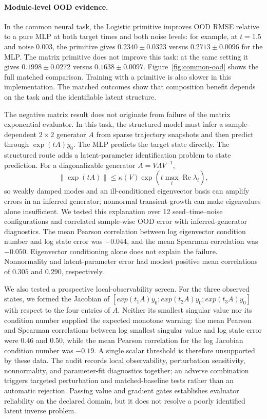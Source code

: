 \documentclass[preprint,12pt]{elsarticle}
\begin{document}
\paragraph{Module-level OOD evidence.}
In the common neural task, the Logistic primitive improves OOD RMSE relative to a pure MLP at both target times and both noise levels: for example, at $t=1.5$ and noise $0.003$, the primitive gives $0.2340\pm0.0323$ versus $0.2713\pm0.0096$ for the MLP. The matrix primitive does not improve this task: at the same setting it gives $0.1998\pm0.0272$ versus $0.1638\pm0.0097$. Figure~\ref{fig:common-ood} shows the full matched comparison. Training with a primitive is also slower in this implementation. The matched outcomes show that composition benefit depends on the task and the identifiable latent structure.

The negative matrix result does not originate from failure of the matrix exponential evaluator. In this task, the structured model must infer a sample-dependent $2\times2$ generator $A$ from sparse trajectory snapshots and then predict through $\exp(tA)y_0$. The MLP predicts the target state directly. The structured route adds a latent-parameter identification problem to state prediction. For a diagonalizable generator $A=V\Lambda V^{-1}$,
\begin{equation}
 \|\exp(tA)\|\leq \kappa(V)\exp\!\left(t\max_i\operatorname{Re}\lambda_i\right),
 \label{eq:matrix-sensitivity}
\end{equation}
so weakly damped modes and an ill-conditioned eigenvector basis can amplify errors in an inferred generator; nonnormal transient growth can make eigenvalues alone insufficient. We tested this explanation over 12 seed--time--noise configurations and correlated sample-wise OOD error with inferred-generator diagnostics. The mean Pearson correlation between log eigenvector condition number and log state error was $-0.044$, and the mean Spearman correlation was $-0.050$. Eigenvector conditioning alone does not explain the failure. Nonnormality and latent-parameter error had modest positive mean correlations of $0.305$ and $0.290$, respectively.

We also tested a prospective local-observability screen. For the three observed states, we formed the Jacobian of $[exp(t_1A)y_0;exp(t_2A)y_0;exp(t_3A)y_0]$ with respect to the four entries of $A$. Neither its smallest singular value nor its condition number supplied the expected monotone warning: the mean Pearson and Spearman correlations between log smallest singular value and log state error were $0.46$ and $0.50$, while the mean Pearson correlation for the log Jacobian condition number was $-0.19$. A single scalar threshold is therefore unsupported by these data. The audit records local observability, perturbation sensitivity, nonnormality, and parameter-fit diagnostics together; an adverse combination triggers targeted perturbation and matched-baseline tests rather than an automatic rejection. Passing value and gradient gates establishes evaluator reliability on the declared domain, but it does not resolve a poorly identified latent inverse problem.
\end{document}
